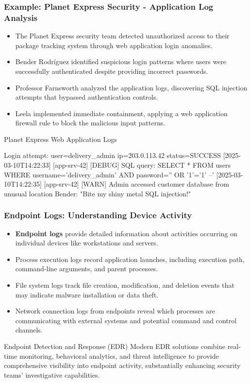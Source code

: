 \documentclass{beamer}
\begin{document}
\begin{frame}[fragile]
\frametitle{Example: Planet Express Security - Application Log Analysis}
\scriptsize
\begin{itemize}
\item The Planet Express security team detected unauthorized access to their package tracking system through web application login anomalies.
\item Bender Rodríguez identified suspicious login patterns where users were successfully authenticated despite providing incorrect passwords.
\item Professor Farnsworth analyzed the application logs, discovering SQL injection attempts that bypassed authentication controls.
\item Leela implemented immediate containment, applying a web application firewall rule to block the malicious input patterns.
\end{itemize}

\begin{exampleblock}{Planet Express Web Application Logs}
\begin{semiverbatim}
 Login attempt: 
user=delivery_admin ip=203.0.113.42 status=SUCCESS
[2025-03-10T14:22:33] [app-srv-42] [DEBUG] SQL query: 
SELECT * FROM users WHERE username='delivery_admin' 
AND password='' OR '1'='1' --'
[2025-03-10T14:22:35] [app-srv-42] [WARN] Admin accessed 
customer database from unusual location
Bender: "Bite my shiny metal SQL injection!"
\end{semiverbatim}
\end{exampleblock}
\end{frame}

\begin{frame}
\frametitle{Endpoint Logs: Understanding Device Activity}
\begin{itemize}
\item \textbf{Endpoint logs} provide detailed information about activities occurring on individual devices like workstations and servers.
\item Process execution logs record application launches, including execution path, command-line arguments, and parent processes.
\item File system logs track file creation, modification, and deletion events that may indicate malware installation or data theft.
\item Network connection logs from endpoints reveal which processes are communicating with external systems and potential command and control channels.
\end{itemize}

\begin{exampleblock}{Endpoint Detection and Response (EDR)}
\scriptsize
Modern EDR solutions combine real-time monitoring, behavioral analytics, and threat intelligence to provide comprehensive visibility into endpoint activity, substantially enhancing security teams' investigative capabilities.
\end{exampleblock}
\end{frame}
\end{document}
